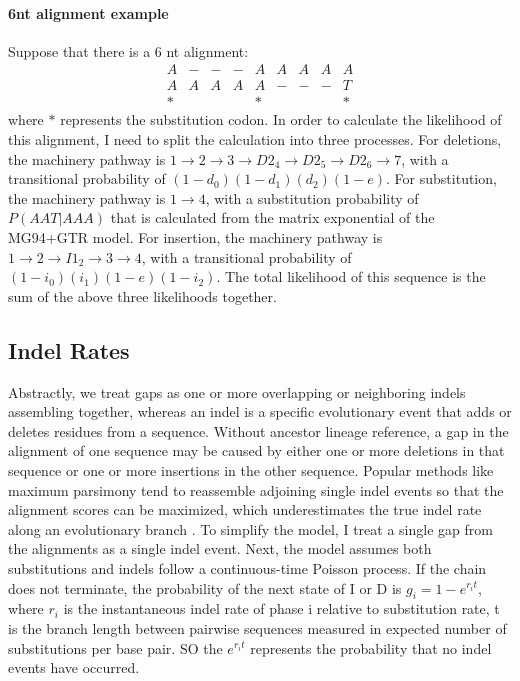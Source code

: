 \paragraph{6nt alignment example} Suppose that there is a 6 nt alignment: 
$$\begin{matrix}
 A & - & - & - & A & A & A & A & A \\
 A & A & A & A & A & - & - & - & T \\
 * &   &   &   & * &   &   &   & * 
\end{matrix}$$
where $*$ represents the substitution codon. In order to calculate the likelihood of this alignment, I need to split the calculation into three processes. For deletions, the machinery pathway is $1 \rightarrow 2 \rightarrow3 \rightarrow D2_4 \rightarrow D2_5 \rightarrow D2_6 \rightarrow 7$, with a transitional probability of $(1-d_0)(1-d_1)(d_2)(1-e)$. For substitution, the machinery pathway is $1 \rightarrow 4$, with a substitution probability of $P(AAT|AAA)$ that is calculated from the matrix exponential of the MG94+GTR model. For insertion, the machinery pathway is $ 1 \rightarrow 2 \rightarrow I1_2 \rightarrow 3 \rightarrow 4$, with a transitional probability of $(1-i_0)(i_1)(1-e)(1-i_2)$. The total likelihood of this sequence is the sum of the above three likelihoods together. 


\subsection{Indel Rates}
Abstractly, we treat gaps as one or more overlapping or neighboring indels assembling together, whereas an indel is a specific evolutionary event that adds or deletes residues from a sequence. Without ancestor lineage reference, a gap in the alignment of one sequence may be caused by either one or more deletions in that sequence or one or more insertions in the other sequence. Popular methods like maximum parsimony tend to reassemble adjoining single indel events so that the alignment scores can be maximized, which underestimates the true indel rate along an evolutionary branch \cite{knudsen2003sequence}. To simplify the model, I treat a single gap from the alignments as a single indel event. Next, the model assumes both substitutions and indels follow a continuous-time Poisson process. If the chain does not terminate, the probability of the next state of I or D is $g_i = 1-e^{r_i t}$, where $r_i$ is the instantaneous indel rate of phase i relative to substitution rate, t is the branch length between pairwise sequences measured in expected number of  substitutions per base pair. SO the $e^{r_i t}$ represents the probability that no indel events have occurred.

